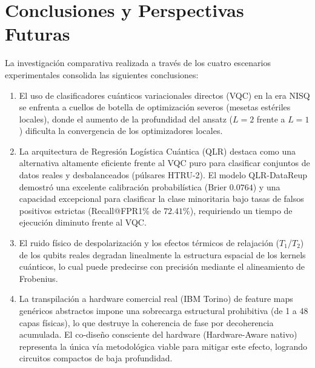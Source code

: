 \documentclass[12pt,oneside]{report}
\begin{document}
\chapter*{Conclusiones y Perspectivas Futuras}

La investigación comparativa realizada a través de los cuatro escenarios experimentales consolida las siguientes conclusiones:
\begin{enumerate}
    \item El uso de clasificadores cuánticos variacionales directos (VQC) en la era NISQ se enfrenta a cuellos de botella de optimización severos (mesetas estériles locales), donde el aumento de la profundidad del ansatz ($L=2$ frente a $L=1$) dificulta la convergencia de los optimizadores locales.
    \item La arquitectura de Regresión Logística Cuántica (QLR) destaca como una alternativa altamente eficiente frente al VQC puro para clasificar conjuntos de datos reales y desbalanceados (púlsares HTRU-2). El modelo QLR-DataReup demostró una excelente calibración probabilística (Brier $0.0764$) y una capacidad excepcional para clasificar la clase minoritaria bajo tasas de falsos positivos estrictas (Recall@FPR1\% de $72.41\%$), requiriendo un tiempo de ejecución diminuto frente al VQC.
    \item El ruido físico de despolarización y los efectos térmicos de relajación ($T_1$/$T_2$) de los qubits reales degradan linealmente la estructura espacial de los kernels cuánticos, lo cual puede predecirse con precisión mediante el alineamiento de Frobenius.
    \item La transpilación a hardware comercial real (IBM Torino) de feature maps genéricos abstractos impone una sobrecarga estructural prohibitiva (de 1 a 48 capas físicas), lo que destruye la coherencia de fase por decoherencia acumulada. El co-diseño consciente del hardware (Hardware-Aware nativo) representa la única vía metodológica viable para mitigar este efecto, logrando circuitos compactos de baja profundidad.
\end{enumerate}
\end{document}

